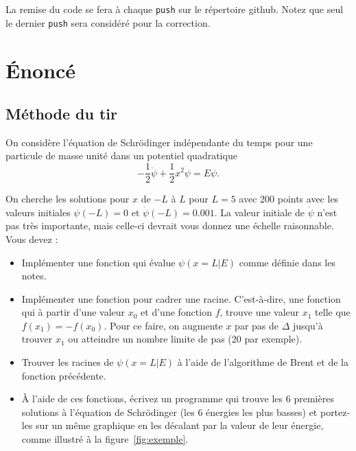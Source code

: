 \documentclass[12pt, letterpaper]{article}
\begin{document}
\bigskip

\noindent La remise du code se fera à chaque \texttt{push} sur le répertoire github.
Notez que seul le dernier \texttt{push} sera considéré pour la correction.


\section{Énoncé}\label{sec:enonce}
\subsection{Méthode du tir}\label{subsec:methode-du-tir}

\noindent On considère l’équation de Schrödinger indépendante du temps pour une particule de masse unité dans
un potentiel quadratique
\begin{equation}
    \label{eq:schrodinger}
    - \frac{1}{2} \ddot{\psi} + \frac{1}{2} x^2 \psi = E \psi.
\end{equation}

\noindent On cherche les solutions pour $x$ de $-L$ à $L$ pour $L = 5$ avec 200 points
avec les valeurs initiales $\psi(-L) = 0$ et $\dot \psi(-L) = 0.001$.
La valeur initiale de $\dot \psi$ n'est pas très importante,
mais celle-ci devrait vous donnez une échelle raisonnable.
Vous devez :
\begin{itemize}
    \item
    Implémenter une fonction qui évalue $\psi(x = L|E)$ comme définie dans les notes.

    \item
    Implémenter une fonction pour cadrer une racine.
    C’est-à-dire, une fonction qui à partir d’une valeur $x_0$ et d’une fonction $f$,
    trouve une valeur $x_1$ telle que $f(x_1) = -f(x_0)$.
    Pour ce faire, on augmente $x$ par pas de $\Delta$ jusqu’à trouver
    $x_1$ ou atteindre un nombre limite de pas (20 par exemple).

    \item
    Trouver les racines de $\psi(x = L|E)$ à l’aide de l’algorithme de Brent et de la fonction précédente.

    \item
    À l’aide de ces fonctions, écrivez un programme qui trouve les 6 premières solutions à l’équation de
    Schrödinger (les 6 énergies les plus basses) et portez-les sur un même graphique en les décalant par la
    valeur de leur énergie, comme illustré à la figure~\ref{fig:exemple}.
\end{itemize}
\end{document}
